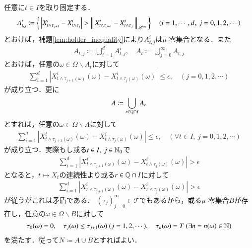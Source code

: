 	\begin{prf}
		任意に$t \in I$を取り固定する．
		\begin{align}
			A_{t,j}^i \coloneqq 
			\left\{\, \left| X_{t \wedge \tau_{j+1}}^i - X_{t \wedge \tau_j}^i \right| > \left\|\, X_{t \wedge \tau_{j+1}}^i - X_{t \wedge \tau_j}^i\, \right\|_{\mathscr{L}^\infty}\, \right\}
			\quad (i=1,\cdots,d,\ j=0,1,2,\cdots)
		\end{align}
		とおけば，補題\ref{lem:holder_inequality}により$A_{t,j}^i$は$\mu$-零集合となる．また
		\begin{align}
			A_{t,j} \coloneqq \bigcup_{i=1}^{d} A_{t,j}^i, \quad
			A_t \coloneqq \bigcup_{j=0}^{\infty} A_{t,j}
		\end{align}
		とおけば，任意の$\omega \in \Omega \backslash A_t$に対して
		\begin{align}
			\sum_{i=1}^{d}\left| X_{t \wedge \tau_{j+1}(\omega)}^i(\omega) - X_{t \wedge \tau_j(\omega)}^i(\omega) \right| \leq \epsilon,
			\quad (j=0,1,2,\cdots)
		\end{align}
		が成り立つ．更に
		\begin{align}
			A \coloneqq \bigcup_{r \in \mathbb{Q} \cap I} A_r
		\end{align}
		とすれば，任意の$\omega \in \Omega \backslash A$に対して
		\begin{align}
			\sum_{i=1}^{d}\left| X_{t \wedge \tau_{j+1}(\omega)}^i(\omega) - X_{t \wedge \tau_j(\omega)}^i(\omega) \right| \leq \epsilon,
			\quad (\forall t \in I,\ j=0,1,2,\cdots)
		\end{align}
		が成り立つ．実際もし或る$t \in I,\ j \in \mathbb{N}_0$で
		\begin{align}
			\sum_{i=1}^{d}\left| X_{t \wedge \tau_{j+1}(\omega)}^i(\omega) - X_{t \wedge \tau_j(\omega)}^i(\omega) \right| > \epsilon
		\end{align}
		となると，$t \longmapsto X_t$の連続性より或る$r \in \mathbb{Q} \cap I$に対して
		\begin{align}
			\sum_{i=1}^{d}\left| X_{r \wedge \tau_{j+1}(\omega)}^i(\omega) - X_{r \wedge \tau_j(\omega)}^i(\omega) \right| > \epsilon
		\end{align}
		が従うがこれは矛盾である．
		$(\tau_j)_{j=0}^{\infty} \in \mathcal{T}$でもあるから，或る$\mu$-零集合$B$が存在し，任意の$\omega \in \Omega \backslash B$に対して
		\begin{align}
			\tau_0(\omega) = 0,\quad \tau_j(\omega) \leq \tau_{j+1}(\omega)\ (j=1,2,\cdots),\quad
			\tau_n(\omega) = T\ (\exists n = n(\omega) \in \mathbb{N})
		\end{align}
		を満たす．従って$N \coloneqq A \cup B$とすればよい．
		\QED
	\end{prf}
	
	